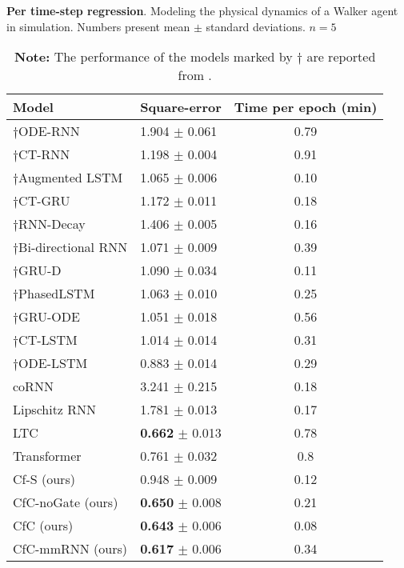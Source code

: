 \documentclass[12pt]{article}
\begin{document}
\begin{table}[t]
    \centering
     \caption{\textbf{Per time-step regression}. Modeling the physical dynamics of a Walker agent in simulation. Numbers present mean $\pm$ standard deviations. $n=5$}
     \begin{tabular}{llc}
     \toprule
     Model & Square-error & Time per epoch (min) \\
\hline
${\dagger}$ODE-RNN \cite{rubanova2019latent} & 1.904 $\pm$ 0.061 & 0.79 \\
${\dagger}$CT-RNN \cite{funahashi1993approximation} & 1.198 $\pm$ 0.004 & 0.91\\
${\dagger}$Augmented LSTM \cite{hochreiter1997long} & 1.065 $\pm$ 0.006 & 0.10 \\
${\dagger}$CT-GRU \cite{mozer2017discrete} & 1.172 $\pm$ 0.011  & 0.18 \\
${\dagger}$RNN-Decay \cite{rubanova2019latent} & 1.406 $\pm$ 0.005 & 0.16\\
${\dagger}$Bi-directional RNN \cite{schuster1997bidirectional} & 1.071 $\pm$ 0.009 & 0.39 \\
${\dagger}$GRU-D \cite{che2018recurrent}& 1.090 $\pm$ 0.034 & 0.11 \\
${\dagger}$PhasedLSTM \cite{neil2016phased} & 1.063 $\pm$ 0.010 & 0.25 \\
${\dagger}$GRU-ODE \cite{rubanova2019latent} & 1.051 $\pm$ 0.018 & 0.56 \\
${\dagger}$CT-LSTM \cite{mei2017neural} & 1.014 $\pm$ 0.014 & 0.31 \\
${\dagger}$ODE-LSTM \cite{lechner2020learning} & 0.883 $\pm$ 0.014 & 0.29 \\
coRNN \cite{rusch2021coupled} & 3.241 $\pm$ 0.215 & 0.18 \\
Lipschitz RNN \cite{erichson2021lipschitz} & 1.781 $\pm$ 0.013 & 0.17 \\
LTC \cite{hasani2021liquid} & \textbf{0.662} $\pm$ 0.013 & 0.78 \\
Transformer \cite{vaswani2017attention} & 0.761 $\pm$ 0.032 & 0.8 \\
     \cmidrule{1-3}
     Cf-S (ours) & 0.948  $\pm$ 0.009 & 0.12 \\
     CfC-noGate (ours) & \textbf{0.650}  $\pm$ 0.008 & 0.21 \\
     CfC (ours) & \textbf{0.643} $\pm$ 0.006 & 0.08 \\
     CfC-mmRNN (ours) & \textbf{0.617} $\pm$ 0.006 & 0.34\\
     \bottomrule
     \end{tabular}
    \caption*{\footnotesize \textbf{Note:} The performance of the models marked by $\dagger$ are reported from \cite{lechner2020learning}.}
 \label{tab:real_walker}
\end{table}
\end{document}
